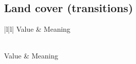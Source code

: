 \documentclass[letterpaper,10pt,english]{sphinxmanual}
\begin{document}
\subsection{Land cover (transitions)}
\label{\detokenize{Introduction/Layers:land-cover-transitions}}

\begin{savenotes}\sphinxatlongtablestart\begin{longtable}[c]{|l|l|}
\hline
\sphinxstyletheadfamily 
\sphinxAtStartPar
Value
&\sphinxstyletheadfamily 
\sphinxAtStartPar
Meaning
\\
\hline
\endfirsthead

%
{}\\
\hline
\sphinxstyletheadfamily 
\sphinxAtStartPar
Value
&\sphinxstyletheadfamily 
\sphinxAtStartPar
Meaning
\\
\hline
\endhead

\hline
{}\\
\endfoot

\endlastfoot


\end{longtable}
\end{savenotes}
\end{document}
